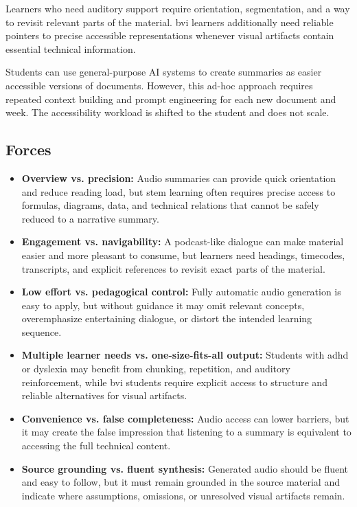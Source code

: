 Learners who need auditory support require orientation, segmentation, and a way to revisit relevant parts of the material. \ac{bvi} learners additionally need reliable pointers to precise accessible representations whenever visual artifacts contain essential technical information.

Students can use general-purpose AI systems to create summaries as easier accessible versions of documents. However, this ad-hoc approach requires repeated context building and prompt engineering for each new document and week. The accessibility workload is shifted to the student and does not scale.


\subsection*{Forces}
\renewcommand*\labelitemi{\textbullet}

\begin{itemize}
    \item \textbf{Overview vs. precision:} Audio summaries can provide quick orientation and reduce reading load, but \ac{stem} learning often requires precise access to formulas, diagrams, data, and technical relations that cannot be safely reduced to a narrative summary.
    \item \textbf{Engagement vs. navigability:} A podcast-like dialogue can make material easier and more pleasant to consume, but learners need headings, timecodes, transcripts, and explicit references to revisit exact parts of the material.
    \item \textbf{Low effort vs. pedagogical control:} Fully automatic audio generation is easy to apply, but without guidance it may omit relevant concepts, overemphasize entertaining dialogue, or distort the intended learning sequence.
    \item \textbf{Multiple learner needs vs. one-size-fits-all output:} Students with \ac{adhd} or dyslexia may benefit from chunking, repetition, and auditory reinforcement, while \ac{bvi} students require explicit access to structure and reliable alternatives for visual artifacts.
    \item \textbf{Convenience vs. false completeness:} Audio access can lower barriers, but it may create the false impression that listening to a summary is equivalent to accessing the full technical content.
    \item \textbf{Source grounding vs. fluent synthesis:} Generated audio should be fluent and easy to follow, but it must remain grounded in the source material and indicate where assumptions, omissions, or unresolved visual artifacts remain.
\end{itemize}

